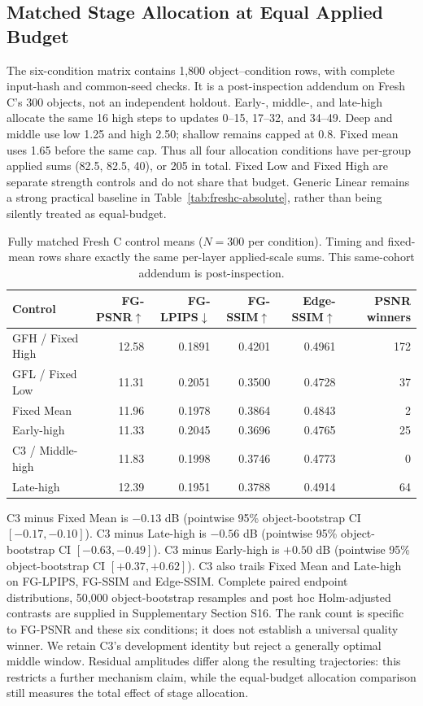\documentclass[times,twocolumn,final]{elsarticle}
\begin{document}
\subsection{Matched Stage Allocation at Equal Applied Budget}
\label{subsec:matched-budget300}
The six-condition matrix contains 1,800 object--condition rows, with complete input-hash and common-seed checks. It is a post-inspection addendum on Fresh C's 300 objects, not an independent holdout. Early-, middle-, and late-high allocate the same 16 high steps to updates 0--15, 17--32, and 34--49. Deep and middle use low 1.25 and high 2.50; shallow remains capped at 0.8. Fixed mean uses 1.65 before the same cap. Thus all four allocation conditions have per-group applied sums (82.5, 82.5, 40), or 205 in total. Fixed Low and Fixed High are separate strength controls and do not share that budget. Generic Linear remains a strong practical baseline in Table~\ref{tab:freshc-absolute}, rather than being silently treated as equal-budget.

\begin{table}[t]
\centering\scriptsize\setlength{\tabcolsep}{4pt}
\caption{Fully matched Fresh C control means ($N=300$ per condition). Timing and fixed-mean rows share exactly the same per-layer applied-scale sums. This same-cohort addendum is post-inspection.}
\label{tab:matched-budget300}
\begin{tabular}{lrrrrr}
\toprule
Control & FG-PSNR$\uparrow$ & FG-LPIPS$\downarrow$ & FG-SSIM$\uparrow$ & Edge-SSIM$\uparrow$ & PSNR winners \\
\midrule
GFH / Fixed High & 12.58 & 0.1891 & 0.4201 & 0.4961 & 172 \\
GFL / Fixed Low & 11.31 & 0.2051 & 0.3500 & 0.4728 & 37 \\
Fixed Mean & 11.96 & 0.1978 & 0.3864 & 0.4843 & 2 \\
Early-high & 11.33 & 0.2045 & 0.3696 & 0.4765 & 25 \\
C3 / Middle-high & 11.83 & 0.1998 & 0.3746 & 0.4773 & 0 \\
Late-high & 12.39 & 0.1951 & 0.3788 & 0.4914 & 64 \\
\bottomrule
\end{tabular}
\end{table}

C3 minus Fixed Mean is $-0.13$ dB (pointwise 95\% object-bootstrap CI $[-0.17,-0.10]$). C3 minus Late-high is $-0.56$ dB (pointwise 95\% object-bootstrap CI $[-0.63,-0.49]$). C3 minus Early-high is $+0.50$ dB (pointwise 95\% object-bootstrap CI $[+0.37,+0.62]$). C3 also trails Fixed Mean and Late-high on FG-LPIPS, FG-SSIM and Edge-SSIM. Complete paired endpoint distributions, 50,000 object-bootstrap resamples and post hoc Holm-adjusted contrasts are supplied in Supplementary Section S16. The rank count is specific to FG-PSNR and these six conditions; it does not establish a universal quality winner. We retain C3's development identity but reject a generally optimal middle window. Residual amplitudes differ along the resulting trajectories: this restricts a further mechanism claim, while the equal-budget allocation comparison still measures the total effect of stage allocation.
\end{document}
